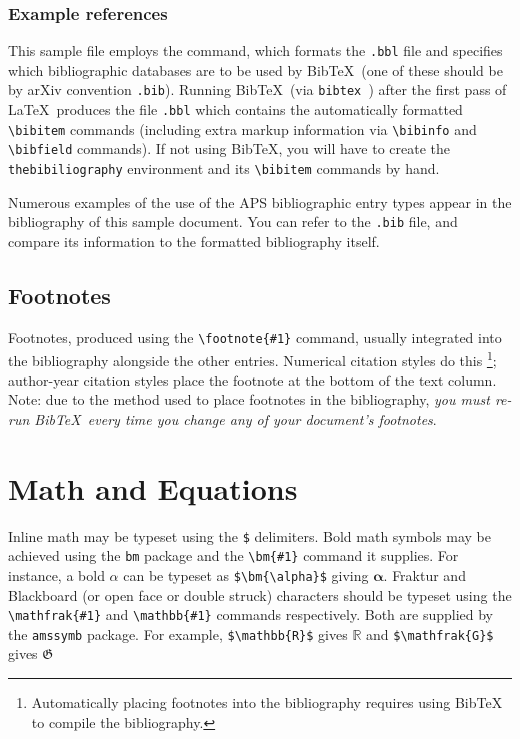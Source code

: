 \documentclass[%
 preprint, linenumbers,
 amsmath,amssymb,
 aps, physrev,
]{revtex4-2}
\begin{document}
\subsubsection{Example references}
This sample file employs the \verb++ command, 
which formats the \texttt{\jobname .bbl} file
and specifies which bibliographic databases are to be used by Bib\TeX\ 
(one of these should be by arXiv convention \texttt{\jobname .bib}).
Running Bib\TeX\ (via \texttt{bibtex \jobname}) 
after the first pass of \LaTeX\ produces the file
\texttt{\jobname .bbl} which contains the automatically formatted
\verb+\bibitem+ commands (including extra markup information via
\verb+\bibinfo+ and \verb+\bibfield+ commands). 
If not using Bib\TeX, you will have to create the \verb+thebibiliography+ environment 
and its \verb+\bibitem+ commands by hand.

Numerous examples of the use of the APS bibliographic entry types appear in the bibliography of this sample document.
You can refer to the \texttt{\jobname .bib} file, 
and compare its information to the formatted bibliography itself.

\subsection{Footnotes}%
Footnotes, produced using the \verb+\footnote{#1}+ command, 
usually integrated into the bibliography alongside the other entries.
Numerical citation styles do this%
\footnote{Automatically placing footnotes into the bibliography requires using BibTeX to compile the bibliography.};
author-year citation styles place the footnote at the bottom of the text column.
Note: due to the method used to place footnotes in the bibliography, 
\emph{you must re-run Bib\TeX\ every time you change any of your document's footnotes}. 

\section{Math and Equations}
Inline math may be typeset using the \verb+$+ delimiters. Bold math
symbols may be achieved using the \verb+bm+ package and the
\verb+\bm{#1}+ command it supplies. For instance, a bold $\alpha$ can
be typeset as \verb+$\bm{\alpha}$+ giving $\bm{\alpha}$. Fraktur and
Blackboard (or open face or double struck) characters should be
typeset using the \verb+\mathfrak{#1}+ and \verb+\mathbb{#1}+ commands
respectively. Both are supplied by the \texttt{amssymb} package. For
example, \verb+$\mathbb{R}$+ gives $\mathbb{R}$ and
\verb+$\mathfrak{G}$+ gives $\mathfrak{G}$
\end{document}
